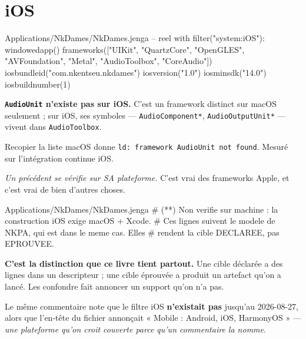 \section{iOS}

\begin{nkcode}{Applications/NkDames/NkDames.jenga -- reel}
with filter("system:iOS"):
    windowedapp()
    frameworks(["UIKit", "QuartzCore", "OpenGLES", "AVFoundation", "Metal",
                "AudioToolbox", "CoreAudio"])
    iosbundleid("com.nkentseu.nkdames")
    iosversion("1.0")
    iosminsdk("14.0")
    iosbuildnumber(1)
\end{nkcode}

\begin{nkpiege}
\textbf{\texttt{AudioUnit} n'existe pas sur iOS.} C'est un framework distinct sur
macOS seulement ; sur iOS, ses symboles --- \texttt{AudioComponent*},
\texttt{AudioOutputUnit*} --- vivent dans \texttt{AudioToolbox}.

Recopier la liste macOS donne \texttt{ld: framework AudioUnit not found}. Mesuré
sur l'intégration continue iOS.

\emph{Un précédent se vérifie sur SA plateforme.} C'est vrai des frameworks
Apple, et c'est vrai de bien d'autres choses.
\end{nkpiege}

\begin{nkretenir}[Ce que le descripteur avoue lui-même]
\begin{nkcode}[listing options={escapeinside={(*}{*)}}]{Applications/NkDames/NkDames.jenga}
# (*\alerte{}*) Non verifie sur machine : la construction iOS exige macOS + Xcode.
# Ces lignes suivent le modele de NKPA, qui est dans le meme cas. Elles
# rendent la cible DECLAREE, pas EPROUVEE.
\end{nkcode}

\textbf{C'est la distinction que ce livre tient partout.} Une cible déclarée a
des lignes dans un descripteur ; une cible éprouvée a produit un artefact qu'on a
lancé. Les confondre fait annoncer un support qu'on n'a pas.

Le même commentaire note que le filtre iOS \textbf{n'existait pas} jusqu'au
2026-08-27, alors que l'en-tête du fichier annonçait « Mobile : Android, iOS,
HarmonyOS » --- \emph{une plateforme qu'on croit couverte parce qu'un commentaire
la nomme}.
\end{nkretenir}

